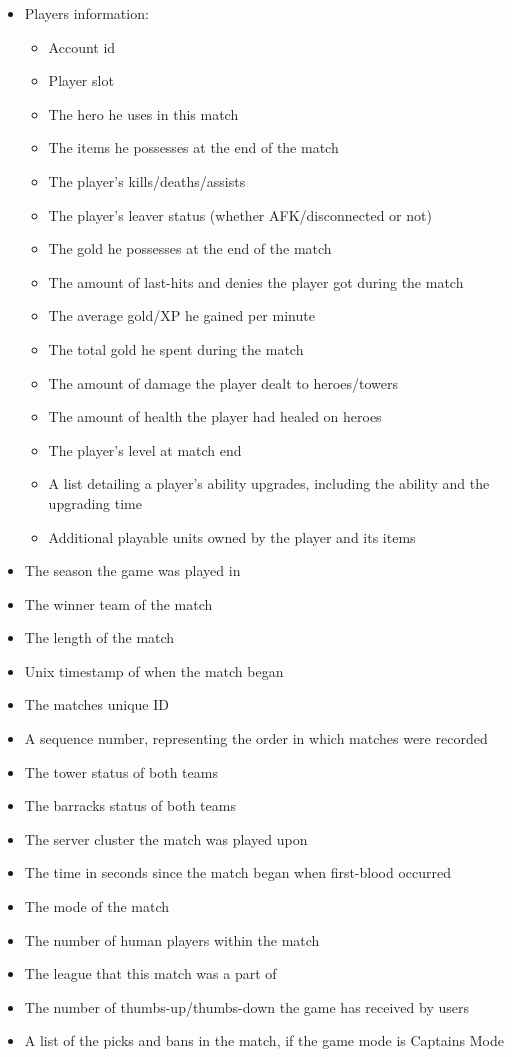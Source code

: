 \documentclass{article}
\begin{document}
\begin{itemize}
	\item Players information:
	\begin{itemize}
		\item Account id
		\item Player slot
		\item The hero he uses in this match
		\item The items he possesses at the end of the match
		\item The player's kills/deaths/assists
		\item The player's leaver status (whether \gls{AFK}/disconnected or not)
		\item The gold he possesses at the end of the match
		\item The amount of \gls{last-hit}s and denies the player got during the match
		\item The average \gls{gold}/\gls{XP} he gained per minute
		\item The total gold he spent during the match
		\item The amount of damage the player dealt to heroes/\gls{towers}
		\item The amount of health the player had healed on heroes
		\item The player's level at match end
		\item A list detailing a player's ability upgrades, including the ability and the upgrading time
		\item Additional playable units owned by the player and its items
	\end{itemize}
	\item The season the game was played in
	\item The winner team of the match
	\item The length of the match
	\item Unix timestamp of when the match began
	\item The matches unique ID
	\item A sequence number, representing the order in which matches were recorded
	\item The tower status of both teams
	\item The \gls{barracks} status of both teams
	\item The server cluster the match was played upon
	\item The time in seconds since the match began when \gls{first-blood} occurred
	\item The \gls{mode} of the match
	\item The number of human players within the match
	\item The league that this match was a part of
	\item The number of thumbs-up/thumbs-down the game has received by users
	\item A list of the picks and bans in the match, if the game \gls{mode} is Captains Mode
\end{itemize}
\end{document}
